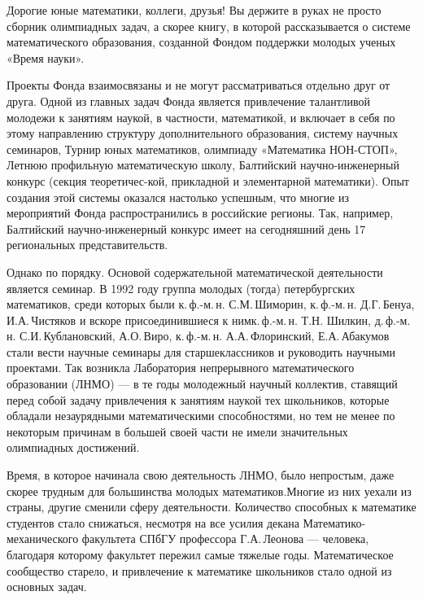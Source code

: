 \ms\abz Дорогие юные математики, коллеги, друзья! Вы держите в руках не просто сборник олимпиадных задач, а скорее книгу, в которой рассказывается о системе математического образования, созданной Фондом поддержки молодых ученых «Время науки».

\ms\abz Проекты Фонда взаимосвязаны и не могут рассматриваться отдельно друг от друга. Одной из главных задач Фонда является привлечение талантливой молодежи к занятиям наукой, в частности, математикой, и включает в себя по этому направлению  структуру дополнительного образования, систему научных семинаров, Турнир юных математиков, олимпиаду «Математика НОН-СТОП», Летнюю профильную математическую школу, Балтийский научно-инженерный конкурс (секция теоретичес-\linebreak кой, прикладной и элементарной математики). Опыт создания этой системы оказался настолько успешным, что многие из мероприятий Фонда распространились в российские регионы. Так, например, Балтийский научно-инженерный конкурс имеет на сегодняшний день 17 региональных представительств.

\ms\abz Однако по порядку. Основой содержательной математической деятельности является семинар. В 1992 году группа  молодых (тогда) петербургских математиков, среди которых были к.\,ф.-м.\,н. С.М.\,Шиморин, к.\,ф.-м.\,н. Д.Г.\,Бенуа, И.А.\,Чистяков и вскоре присоединившиеся к ним\linebreak к.\,ф.-м.\,н. Т.Н. Шилкин, д.\,ф.-м.\,н. С.И.\,Кублановский, А.О.\,Виро, к.\,ф.-м.\,н. А.А.\,Флоринский, Е.А.\,Абакумов стали вести научные семинары для старшеклассников и руководить научными проектами. Так возникла Лаборатория непрерывного математического образовании (ЛНМО) — в те годы молодежный научный коллектив, ставящий перед собой задачу привлечения к занятиям наукой тех школьников, которые обладали незаурядными математическими способностями, но тем не менее по некоторым причинам в большей своей части не имели значительных олимпиадных достижений.

\ms\abz Время, в которое начинала свою деятельность ЛНМО, было непростым, даже скорее трудным для большинства молодых математиков.\linebreak Многие из них уехали из страны, другие сменили сферу деятельности. Количество способных к математике студентов стало снижаться, несмотря на все усилия декана Математико-механического факультета СПбГУ профессора Г.А.\,Леонова — человека, благодаря которому факультет пережил самые тяжелые годы. Математическое сообщество старело, и привлечение к математике школьников стало одной из основных задач.

